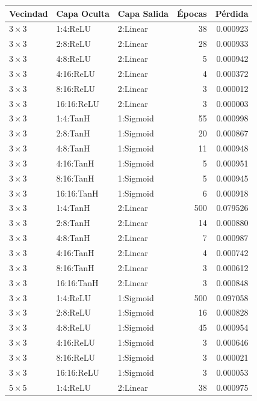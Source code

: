 \begin{table}[h]
	\centering
	\begin{tabular}{lllrr}
		\toprule
		\textbf{Vecindad} & \textbf{Capa Oculta} & \textbf{Capa Salida} & \textbf{Épocas} & \textbf{Pérdida} \\
		\midrule
		$3\times3$ & 1:4:ReLU & 2:Linear & 38 & 0.000923 \\
		$3\times3$ & 2:8:ReLU & 2:Linear & 28 & 0.000933 \\
		$3\times3$ & 4:8:ReLU & 2:Linear & 5 & 0.000942 \\
		$3\times3$ & 4:16:ReLU & 2:Linear & 4 & 0.000372 \\
		$3\times3$ & 8:16:ReLU & 2:Linear & 3 & 0.000012 \\
		$3\times3$ & 16:16:ReLU & 2:Linear & 3 & 0.000003 \\
		$3\times3$ & 1:4:TanH & 1:Sigmoid & 55 & 0.000998 \\
		$3\times3$ & 2:8:TanH & 1:Sigmoid & 20 & 0.000867 \\
		$3\times3$ & 4:8:TanH & 1:Sigmoid & 11 & 0.000948 \\
		$3\times3$ & 4:16:TanH & 1:Sigmoid & 5 & 0.000951 \\
		$3\times3$ & 8:16:TanH & 1:Sigmoid & 5 & 0.000945 \\
		$3\times3$ & 16:16:TanH & 1:Sigmoid & 6 & 0.000918 \\
		$3\times3$ & 1:4:TanH & 2:Linear & 500 & 0.079526 \\
		$3\times3$ & 2:8:TanH & 2:Linear & 14 & 0.000880 \\
		$3\times3$ & 4:8:TanH & 2:Linear & 7 & 0.000987 \\
		$3\times3$ & 4:16:TanH & 2:Linear & 4 & 0.000742 \\
		$3\times3$ & 8:16:TanH & 2:Linear & 3 & 0.000612 \\
		$3\times3$ & 16:16:TanH & 2:Linear & 3 & 0.000848 \\
		$3\times3$ & 1:4:ReLU & 1:Sigmoid & 500 & 0.097058 \\
		$3\times3$ & 2:8:ReLU & 1:Sigmoid & 16 & 0.000828 \\
		$3\times3$ & 4:8:ReLU & 1:Sigmoid & 45 & 0.000954 \\
		$3\times3$ & 4:16:ReLU & 1:Sigmoid & 3 & 0.000646 \\
		$3\times3$ & 8:16:ReLU & 1:Sigmoid & 3 & 0.000021 \\
		$3\times3$ & 16:16:ReLU & 1:Sigmoid & 3 & 0.000053 \\
		\midrule
		$5\times5$ & 1:4:ReLU & 2:Linear & 38 & 0.000975 \\

\end{tabular}
\end{table}
